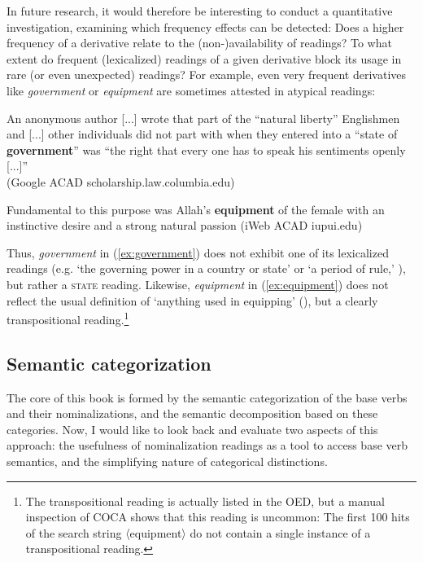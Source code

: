 In future research, it would therefore be interesting to conduct a quantitative investigation, examining which frequency effects can be detected: 
Does a higher frequency of a derivative relate to the (non-)availability of readings? 
To what extent do frequent (lexicalized) readings of a given derivative block its usage in rare (or even unexpected) readings? 
For example, even very frequent derivatives like \textit{government} or \textit{equipment} are sometimes attested in atypical readings:

\begin{exe}
	\ex 
	\begin{xlist}
	\item \label{ex:government} An anonymous author [...] wrote that part of the ``natural liberty'' Englishmen and [...] other individuals did not part with when they entered into a ``state of \textbf{government}'' was ``the right that every one has to speak his sentiments openly [...]'' \\ {\small(Google ACAD scholarship.law.columbia.edu)}
	\item \label{ex:equipment} Fundamental to this purpose was Allah's \textbf{equipment} of the female with an instinctive desire and a strong natural passion {\small(\ac{iWeb} ACAD iupui.edu)}
	\end{xlist}
\end{exe}

\noindent Thus, \textit{government} in (\ref{ex:government}) does not exhibit one of its lexicalized readings (e.g. `the governing power in a country or state' or `a period of rule,' ), but rather a \textsc{state} reading. Likewise, \textit{equipment} in (\ref{ex:equipment}) does not reflect the usual definition of `anything used in equipping' (), but a clearly transpositional reading.\footnote{The transpositional reading is actually listed in the OED, but a manual inspection of COCA shows that this reading is uncommon: The first 100 hits of the search string 〈equipment〉 do not contain a single instance of a transpositional reading.}

\subsection{Semantic categorization}
\label{sec:disc-evaluation-semcat}

The core of this book is formed by the semantic categorization of the base verbs and their nominalizations, and the semantic decomposition based on these categories.
Now, I would like to look back and evaluate two aspects of this approach: the usefulness of nominalization readings as a tool to access base verb semantics, and the simplifying nature of categorical distinctions.

